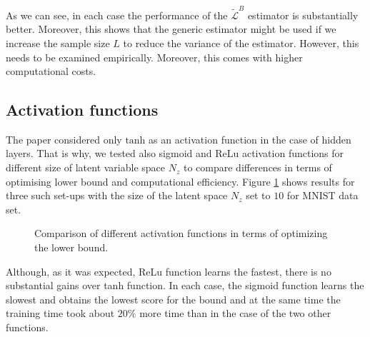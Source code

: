 \documentclass[../report.tex]{subfiles}
\begin{document}
As we can see, in each case the performance of the $\widetilde{\mathcal{L}}^{B}$ estimator is substantially better. Moreover, this shows that the generic estimator might be used if we increase the sample size $L$ to reduce the variance of the estimator. However, this needs to be examined empirically. Moreover, this comes with higher computational costs.

\subsection{Activation functions}
The paper considered only $\text{tanh}$ as an activation function in the case of hidden layers. That is why, we tested also sigmoid and ReLu activation functions for different size of latent variable space $N_z$ to compare differences in terms of optimising lower bound and computational efficiency. Figure \ref{fig:mnist_activation} shows results for three such set-ups with the size of the latent space  $N_z$ set to $10$ for MNIST data set.

\begin{figure}[!htb]
\centering
  \caption[1]{Comparison of different activation functions in terms of optimizing the lower bound. }
\label{fig:mnist_activation}
\end{figure}

Although, as it was expected, ReLu function learns the fastest, there is no substantial gains over tanh function. In each case, the sigmoid function learns the slowest and obtains the lowest score for the bound and at the same time the training time took about $20\%$ more time than in the case of the two other functions.
\end{document}
